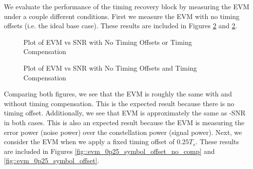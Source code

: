 \documentclass{article}
\begin{document}
We evaluate the performance of the timing recovery block by measuring the EVM under a couple different conditions. First we measure the EVM with no timing offsets (i.e. the ideal base case). These results are included in Figures \ref{fig::evm_no_timing_offset} and \ref{fig::evm_no_timing_offset}.

\begin{figure}[H]
	\centerline{}
	\caption{Plot of EVM vs SNR with No Timing Offsets or Timing Compensation}
	\label{fig::evm_no_timing_offset_no_comp}
\end{figure}

\begin{figure}[H]
	\centerline{}
	\caption{Plot of EVM vs SNR with No Timing Offsets and Timing Compensation}
	\label{fig::evm_no_timing_offset}
\end{figure}

Comparing both figures, we see that the EVM is roughly the same with and without timing compensation. This is the expected result because there is no timing offset. Additionally, we see that EVM is approximately the same as -SNR in both cases. This is also an expected result because the EVM is measuring the error power (noise power) over the constellation power (signal power). Next, we consider the EVM when we apply a fixed timing offset of $0.25T_s$. These results are included in Figures \ref{fig::evm_0p25_symbol_offset_no_comp} and \ref{fig::evm_0p25_symbol_offset}.
\end{document}
